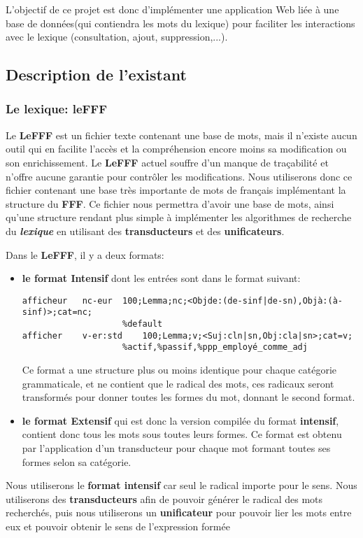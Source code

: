 {L'objectif de ce projet est donc d'implémenter une application Web liée à une base de données(qui contiendra les mots du lexique) pour faciliter les interactions avec le lexique (consultation, ajout, suppression,...).\par}


\subsection{Description de l'existant }

\subsubsection{Le lexique: leFFF}
{Le \textbf{LeFFF} est un fichier texte contenant une base de mots, mais il n'existe aucun outil qui en facilite l'accès et la compréhension encore moins sa modification ou son enrichissement. Le \textbf{LeFFF} actuel souffre d'un manque de traçabilité et n'offre aucune garantie pour contrôler les modifications. Nous utiliserons donc ce fichier contenant une base très importante de mots de français implémentant la structure du \textbf{FFF}. Ce fichier nous permettra d'avoir une base de mots, ainsi qu'une structure rendant plus simple à implémenter les algorithmes de recherche du \textit{\bf lexique} en utilisant des \textbf{transducteurs} et des \textbf{unificateurs}.\par}
{Dans le \textbf{LeFFF}, il y a deux formats:\par}
\begin{itemize}
\item \textbf{le format Intensif} dont les entrées sont dans le format suivant:
\small
\begin{verbatim}
afficheur	nc-eur	100;Lemma;nc;<Objde:(de-sinf|de-sn),Objà:(à-sinf)>;cat=nc;
                    %default
afficher	v-er:std	100;Lemma;v;<Suj:cln|sn,Obj:cla|sn>;cat=v;
                    %actif,%passif,%ppp_employé_comme_adj
\end{verbatim}
\normalsize
Ce format a une structure plus ou moins identique pour chaque catégorie grammaticale, et ne contient que le radical des mots, ces radicaux seront transformés pour donner toutes les formes du mot, donnant le second format.
\item \textbf{le format Extensif} qui est donc la version compilée du format \textbf{intensif}, contient donc tous les mots sous toutes leurs formes. Ce format est obtenu par l'application d'un transducteur pour chaque mot formant toutes ses formes selon sa catégorie.
\end{itemize}
{Nous utiliserons le \textbf{format intensif} car seul le radical importe pour le sens. Nous utiliserons des \textbf{transducteurs} afin de pouvoir générer le radical des mots recherchés, puis nous utiliserons un \textbf{unificateur} pour pouvoir lier les mots entre eux et pouvoir obtenir le sens de l'expression formée}

